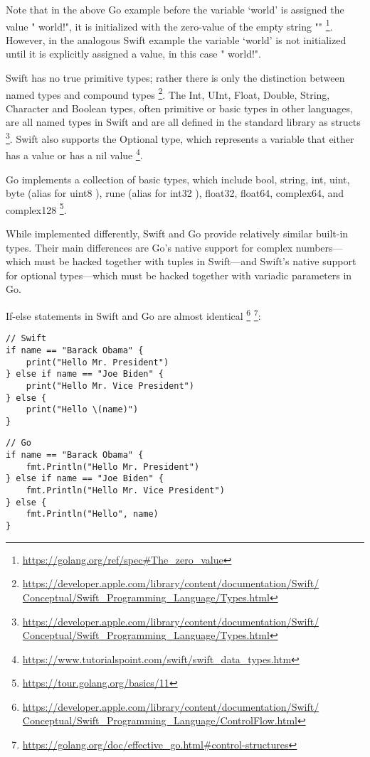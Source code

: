 \documentclass[letterpaper]{article}
\begin{document}
Note that in the above Go example before the variable `world' is assigned the value " world!", it is initialized with the zero-value of the empty string "" \footnote{\url{https://golang.org/ref/spec#The_zero_value}}. However, in the analogous Swift example the variable `world' is not initialized until it is explicitly assigned a value, in this case " world!".

Swift has no true primitive types; rather there is only the distinction between named types and compound types \footnote{\url{https://developer.apple.com/library/content/documentation/Swift/
Conceptual/Swift_Programming_Language/Types.html}}. The Int, UInt, Float, Double, String, Character and Boolean types, often primitive or basic types in other languages, are all named types in Swift and are all defined in the standard library as structs \footnote{\url{https://developer.apple.com/library/content/documentation/Swift/
Conceptual/Swift_Programming_Language/Types.html}}. Swift also supports the Optional type, which represents a variable that either has a value or has a nil value \footnote{\url{https://www.tutorialspoint.com/swift/swift_data_types.htm}}.

Go implements a collection of basic types, which include bool, string, int, uint, byte (alias for uint8 ), rune (alias for int32 ), float32, float64, complex64, and complex128 \footnote{\url{https://tour.golang.org/basics/11}}.

While implemented differently, Swift and Go provide relatively similar built-in types. Their main differences are Go’s native support for complex numbers—which must be hacked together with tuples in Swift—and Swift’s native support for optional types—which must be hacked together with variadic parameters in Go.

If-else statements in Swift and Go are almost identical \footnote{\url{https://developer.apple.com/library/content/documentation/Swift/ Conceptual/Swift_Programming_Language/ControlFlow.html}} \footnote{\url{https://golang.org/doc/effective_go.html#control-structures}}:

\begin{verbatim}
// Swift
if name == "Barack Obama" {
    print("Hello Mr. President")
} else if name == "Joe Biden" {
    print("Hello Mr. Vice President")
} else {
    print("Hello \(name)")
}
\end{verbatim}

\begin{verbatim}
// Go
if name == "Barack Obama" {
    fmt.Println("Hello Mr. President")
} else if name == "Joe Biden" {
    fmt.Println("Hello Mr. Vice President")
} else {
    fmt.Println("Hello", name)
}
\end{verbatim}
\end{document}
